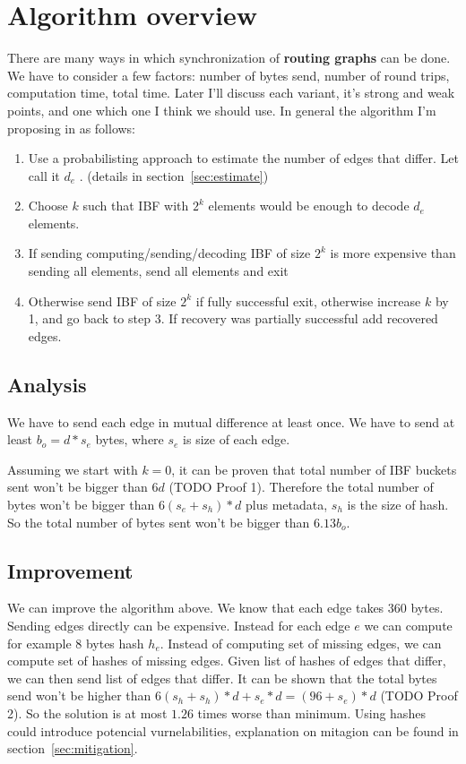 \documentclass[11pt]{article}
\begin{document}
\section{Algorithm overview}
There are many ways in which synchronization of \textbf{routing graphs} can be done.
We have to consider a few factors: number of bytes send, number of round trips, computation time, total time.
Later I'll discuss each variant, it's strong and weak points, and one which one I think we should use.
In general the algorithm I'm proposing in as follows:
\begin{enumerate}
  \item Use a probabilisting approach to estimate the number of edges that differ. Let call it $d_e$ . (details in section~\ref{sec:estimate})
  \item Choose $k$ such that IBF with $2^k$ elements would be enough to decode $d_e$ elements.
  \item If sending computing/sending/decoding IBF of size $2^k$ is more expensive than sending all elements, send all elements and exit
  \item Otherwise send IBF of size $2^k$ if fully successful exit, otherwise increase $k$ by 1, and go back to step 3.
 If recovery was partially successful add recovered edges.
\end{enumerate}
\subsection{Analysis}
We have to send each edge in mutual difference at least once.
We have to send at least $b_o = d*s_e$ bytes, where $s_e$ is size of each edge.

Assuming we start with $k=0$, it can be proven that total number of IBF buckets sent won't be bigger than $6d$  (TODO Proof 1).
Therefore the total number of bytes won't be bigger than $6(s_e+s_h)*d$ plus metadata, $s_h$ is the size of hash.
So the total number of bytes sent won't be bigger than $6.13b_o$.
\subsection{Improvement}
We can improve the algorithm above. We know that each edge takes 360 bytes. Sending edges directly can be expensive. Instead for each edge $e$ we can compute for example 8 bytes hash $h_e$.
Instead of computing set of missing edges, we can compute set of hashes of missing edges. Given list of hashes of edges that differ, we can then send list of edges that differ.
It can be shown that the total bytes send won't be higher than $6(s_h+s_h)*d + s_e * d = (96+s_e)*d$ (TODO Proof 2). So the solution is at most $1.26$ times worse than minimum.
Using hashes could introduce potencial vurnelabilities, explanation on mitagion can be found in section~\ref{sec:mitigation}.
\end{document}
